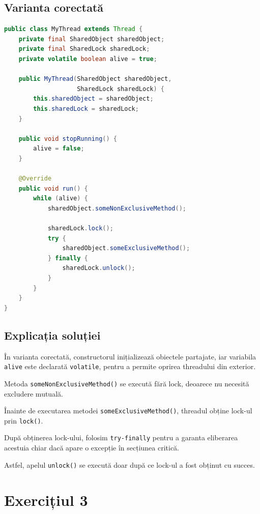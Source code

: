 \documentclass[12pt,a4paper]{article}
\begin{document}
\subsection*{Varianta corectată}

\begin{lstlisting}[language=Java,
    basicstyle=\ttfamily\small,
    breaklines=true,
    frame=single,
    showstringspaces=false]
public class MyThread extends Thread {
    private final SharedObject sharedObject;
    private final SharedLock sharedLock;
    private volatile boolean alive = true;

    public MyThread(SharedObject sharedObject,
                    SharedLock sharedLock) {
        this.sharedObject = sharedObject;
        this.sharedLock = sharedLock;
    }

    public void stopRunning() {
        alive = false;
    }

    @Override
    public void run() {
        while (alive) {
            sharedObject.someNonExclusiveMethod();

            sharedLock.lock();
            try {
                sharedObject.someExclusiveMethod();
            } finally {
                sharedLock.unlock();
            }
        }
    }
}
\end{lstlisting}

\subsection*{Explicația soluției}

În varianta corectată, constructorul
inițializează obiectele partajate,
iar variabila \texttt{alive} este declarată
\texttt{volatile}, pentru a permite oprirea
threadului din exterior.

Metoda \texttt{someNonExclusiveMethod()}
se execută fără lock, deoarece nu necesită
excludere mutuală.

Înainte de executarea metodei
\texttt{someExclusiveMethod()}, threadul
obține lock-ul prin \texttt{lock()}.

După obținerea lock-ului, folosim
\texttt{try-finally} pentru a garanta
eliberarea acestuia chiar dacă apare
o excepție în secțiunea critică.

Astfel, apelul \texttt{unlock()} se execută
doar după ce lock-ul a fost obținut
cu succes.


\newpage
\section*{Exercițiul 3}
\end{document}
